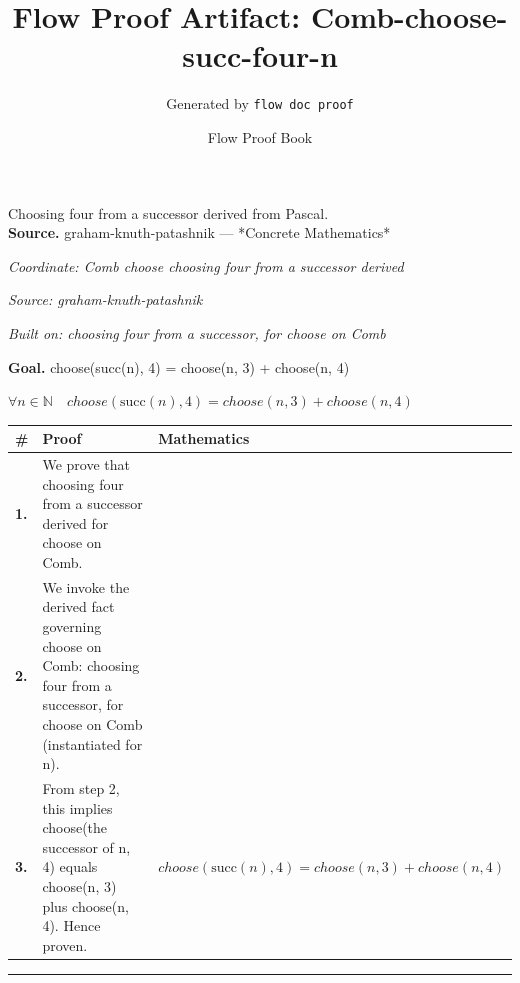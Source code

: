 \documentclass[11pt]{article}
\title{Flow Proof Artifact: Comb-choose-succ-four-n}
\author{Generated by \texttt{flow doc proof}}
\date{Flow Proof Book}
\theoremstyle{definition}
\begin{document}
\maketitle
Choosing four from a successor derived from Pascal.\\[0.5em]
\textbf{Source.} graham-knuth-patashnik — *Concrete Mathematics*\\[0.5em]
\bigskip
{}\par
\smallskip\noindent\textit{Coordinate: Comb \cdot choose \cdot choosing four from a successor derived}\par
\smallskip\noindent\textit{Source: graham-knuth-patashnik}\par
\smallskip\noindent\textit{Built on: choosing four from a successor, for choose on Comb}\par
\medskip
\noindent\textbf{Goal.} choose(succ(n), 4) = choose(n, 3) + choose(n, 4)\par
\noindent$\displaystyle \forall n \in \mathbb{N}\quad choose(\mathrm{succ}(n), 4) = choose(n, 3) + choose(n, 4)$\par
\medskip
\noindent
\begin{tabular}{@{} >{\raggedright\arraybackslash}p{} >{\raggedright\arraybackslash}p{} >{\raggedleft\arraybackslash}p{} @{}}
\textbf{\#} & \textbf{Proof} & \textbf{Mathematics} \\
\midrule
\textbf{1.} & We prove that choosing four from a successor derived for choose on Comb. & \\[0.45em]
\textbf{2.} & We invoke the derived fact governing choose on Comb: choosing four from a successor, for choose on Comb (instantiated for n). & \\[0.45em]
\textbf{3.} & From step 2, this implies choose(the successor of n, 4) equals choose(n, 3) plus choose(n, 4). Hence proven. & $\displaystyle choose(\mathrm{succ}(n), 4) = choose(n, 3) + choose(n, 4)$ \\[0.45em]
\bottomrule
\end{tabular}
\label{thm:Comb-choose-choosing_four_from_a_successor_derived}
\par\medskip\hrule
\end{document}
